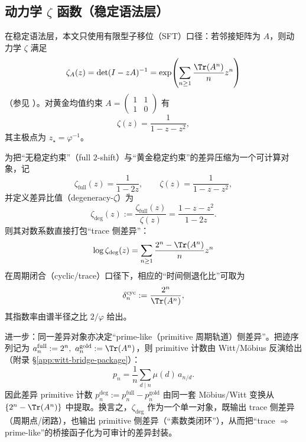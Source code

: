 \subsection{动力学 \texorpdfstring{$\zeta$}{zeta} 函数（稳定语法层）}\label{subsec:zeta-syntax-zeta}

在稳定语法层，本文只使用有限型子移位（SFT）口径：若邻接矩阵为 $A$，则动力学 $\zeta$ 满足
\[
\zeta_A(z)=\det(I-zA)^{-1}
=\exp\!\left(\sum_{n\ge 1}\frac{\Tr(A^n)}{n}z^n\right)
\]
（参见 \cite{LindMarcus1995}）。对黄金均值约束
\(
A=\begin{pmatrix}1&1\\1&0\end{pmatrix}
\)
有
\[
\zeta(z)=\frac{1}{1-z-z^2},
\]
其主极点为 $z_\star=\varphi^{-1}$。

\begin{remark}\label{rem:degeneracy-zeta-bridge}
为把“无稳定约束”（full $2$-shift）与“黄金稳定约束”的差异压缩为一个可计算对象，记
\[
\zeta_{\mathrm{full}}(z)=\frac{1}{1-2z},
\qquad
\zeta(z)=\frac{1}{1-z-z^2},
\]
并定义差异比值（degeneracy-$\zeta$）为
\[
\zeta_{\mathrm{deg}}(z):=\frac{\zeta_{\mathrm{full}}(z)}{\zeta(z)}
=\frac{1-z-z^2}{1-2z}.
\]
则其对数系数直接打包“trace 侧差异”：
\[
\log \zeta_{\mathrm{deg}}(z)
=\sum_{n\ge 1}\frac{2^n-\Tr(A^n)}{n}z^n
\]
在周期闭合（cyclic/trace）口径下，相应的“时间侧退化比”可取为
\[
\delta_n^{\mathrm{cyc}}:=\frac{2^n}{\Tr(A^n)},
\]
其指数率由谱半径之比 \(2/\varphi\) 给出。

进一步：同一差异对象亦决定“prime-like（primitive 周期轨道）侧差异”。把迹序列记为
\(
a_n^{\mathrm{full}}:=2^n,\ a_n^{\mathrm{gold}}:=\Tr(A^n)
\)，则 primitive 计数由 Witt/Möbius 反演给出（附录 \S\ref{app:witt-bridge-package}）：
\[
p_n=\frac{1}{n}\sum_{d\mid n}\mu(d)\,a_{n/d}.
\]
因此差异 primitive 计数
\(
p_n^{\mathrm{deg}}:=p_n^{\mathrm{full}}-p_n^{\mathrm{gold}}
\)
由同一套 Möbius/Witt 变换从 \(\{2^n-\Tr(A^n)\}\) 中提取。换言之，\(\zeta_{\mathrm{deg}}\) 作为一个单一对象，既输出 trace 侧差异（周期点/闭路），也输出 primitive 侧差异（“素数类闭环”），从而把“trace \(\Rightarrow\) prime-like”的桥接函子化为可审计的差异封装。
\end{remark}

